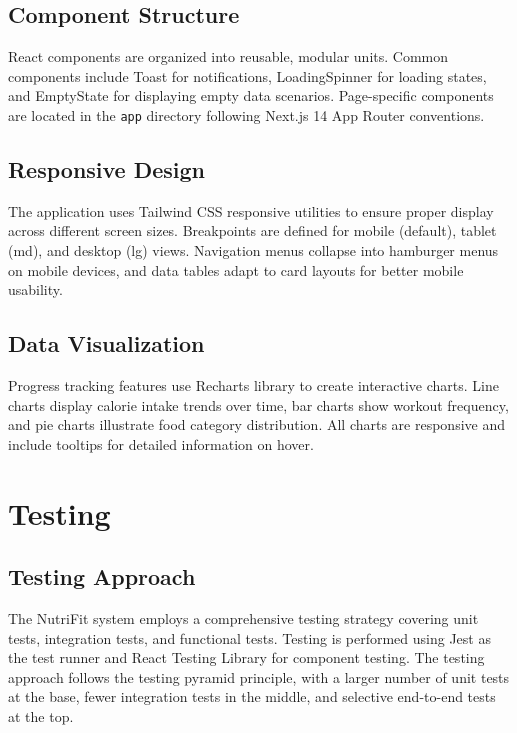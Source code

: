 \subsection{Component Structure}

React components are organized into reusable, modular units. Common components include Toast for notifications, LoadingSpinner for loading states, and EmptyState for displaying empty data scenarios. Page-specific components are located in the \texttt{app} directory following Next.js 14 App Router conventions.

\subsection{Responsive Design}

The application uses Tailwind CSS responsive utilities to ensure proper display across different screen sizes. Breakpoints are defined for mobile (default), tablet (md), and desktop (lg) views. Navigation menus collapse into hamburger menus on mobile devices, and data tables adapt to card layouts for better mobile usability.

\subsection{Data Visualization}

Progress tracking features use Recharts library to create interactive charts. Line charts display calorie intake trends over time, bar charts show workout frequency, and pie charts illustrate food category distribution. All charts are responsive and include tooltips for detailed information on hover.

\section{Testing}

\subsection{Testing Approach}

The NutriFit system employs a comprehensive testing strategy covering unit tests, integration tests, and functional tests. Testing is performed using Jest as the test runner and React Testing Library for component testing. The testing approach follows the testing pyramid principle, with a larger number of unit tests at the base, fewer integration tests in the middle, and selective end-to-end tests at the top.

